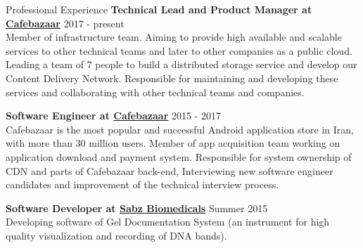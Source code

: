 \documentclass{resume} %
\begin{document}
\begin{rSection}{Professional Experience}
	{\bf Technical Lead and Product Manager at \href{https://cafebazaar.ir/}{Cafebazaar}} \hfill 2017 - present
	\\ Member of infrastructure team. Aiming to provide high available and scalable services to other technical teams and later to other companies as a public cloud. Leading a team of 7 people to build a distributed storage service and develop our Content Delivery Network. Responsible for maintaining and developing these services and collaborating with other technical teams and companies.
	
	{\bf Software Engineer at \href{https://cafebazaar.ir/}{Cafebazaar}} \hfill 2015 - 2017
	\\ Cafebazaar is the most popular and successful Android application store in Iran, with more than 30 million users. Member of app acquisition team working on application download and payment system. Responsible for system ownership of CDN and parts of Cafebazaar back-end, Interviewing new software engineer candidates and improvement of the technical interview process.
	
	{\bf Software Developer at \href{http://www.sabzgroup.com/}{Sabz Biomedicals}} \hfill Summer 2015
	\\Developing software of Gel Documentation System (an instrument for  high quality visualization and recording of DNA bands).
\end{rSection}
\end{document}
